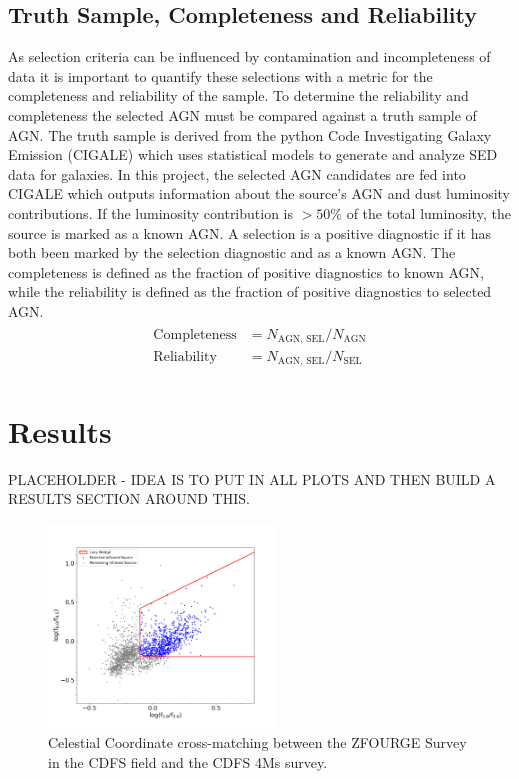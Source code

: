 \documentclass[12pt]{iopart}
\begin{document}
\subsection{Truth Sample, Completeness and Reliability}
As selection criteria can be influenced by contamination and incompleteness of data it is important to quantify these selections with a metric for the completeness and reliability of the sample. To determine the reliability and completeness the selected AGN must be compared against a truth sample of AGN. The truth sample is derived from the python Code Investigating Galaxy Emission (CIGALE) \cite{boquien_cigale_2019, yang_x-cigale_2020} which uses statistical models to generate and analyze SED data for galaxies. In this project, the selected AGN candidates are fed into CIGALE which outputs information about the source's AGN and dust luminosity contributions. If the luminosity contribution is $>50\%$ of the total luminosity, the source is marked as a known AGN. A selection is a positive diagnostic if it has both been marked by the selection diagnostic and as a known AGN. The completeness is defined as the fraction of positive diagnostics to known AGN, while the reliability is defined as the fraction of positive diagnostics to selected AGN. 
\begin{align*}
    \begin{split}
        \text{Completeness} &= N_{\text{AGN, SEL} }/N_{\text{AGN}}\\
        \text{Reliability} &= N_{\text{AGN, SEL} }/N_{\text{SEL}}
    \end{split}
\end{align*}
\section{Results}

PLACEHOLDER - IDEA IS TO PUT IN ALL PLOTS AND THEN BUILD A RESULTS SECTION AROUND THIS.

\begin{figure}[h]
  \centering
  \includegraphics[width=0.54\textwidth]{plots/CDFSLacyWedge.png}
  \caption{Celestial Coordinate cross-matching between the ZFOURGE Survey in the CDFS field and the CDFS 4Ms survey.}
  \label{fig:your_label}
\end{figure}
\end{document}
